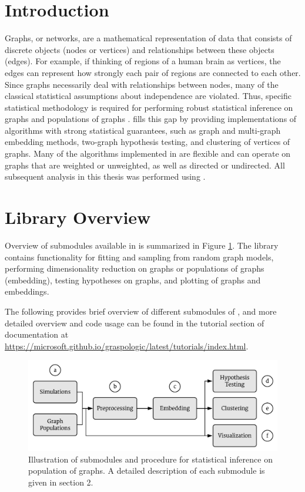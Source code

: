 \section{Introduction}
Graphs, or networks, are a mathematical representation of data that consists of discrete objects (nodes or vertices) and relationships between these objects (edges). For example, if thinking of regions of a human brain as vertices, the edges can represent how strongly each pair of regions are connected to each other. 
Since graphs necessarily deal with relationships between nodes, many of the classical statistical assumptions about independence are violated. Thus, specific statistical methodology is required for performing robust statistical inference on graphs and populations of graphs \citep{survey-rdpg}. \graspy fills this gap by providing implementations of algorithms with strong statistical guarantees, such as graph and multi-graph embedding methods, two-graph hypothesis testing, and clustering of vertices of graphs. Many of the algorithms implemented in \graspy are flexible and can operate on graphs that are weighted or unweighted, as well as directed or undirected. All subsequent analysis in this thesis was performed using \graspy.

\section{Library Overview}
Overview of submodules available in \graspy is summarized in Figure \ref{fig:graspy}. The library contains functionality for fitting and sampling from random graph models, performing dimensionality reduction on graphs or populations of graphs (embedding), testing hypotheses on graphs, and plotting of graphs and embeddings.

The following provides brief overview of different submodules of \graspy, and more detailed overview and code usage can be found in the tutorial section of \graspy documentation at \url{https://microsoft.github.io/graspologic/latest/tutorials/index.html}.

\begin{figure}[t]
    \centering
    \includegraphics[width=.8\linewidth]{figures/graspy/graspy.pdf}
    \caption{Illustration of submodules and procedure for statistical inference on population of graphs. A detailed description of each submodule is given in section 2.}
    \label{fig:graspy}
\end{figure}

